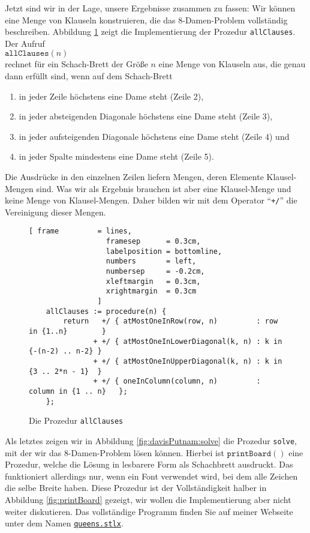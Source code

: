 Jetzt sind wir in der Lage, unsere Ergebnisse zusammen zu fassen:  Wir können eine
Menge von Klauseln konstruieren, die das 8-Damen-Problem vollständig beschreiben.
Abbildung \ref{fig:allClauses} zeigt die Implementierung der Prozedur \texttt{allClauses}.
Der Aufruf \\[0.2cm]
\hspace*{1.3cm} $\texttt{allClauses}(n)$ \\[0.2cm]
rechnet für ein Schach-Brett der Größe $n$ eine Menge von Klauseln aus, die
genau dann erfüllt sind, wenn auf dem Schach-Brett
\begin{enumerate}
\item in jeder Zeile höchstens eine Dame steht (Zeile 2),
\item in jeder absteigenden Diagonale höchstens eine Dame steht (Zeile 3),
\item in jeder aufsteigenden Diagonale höchstens eine Dame steht (Zeile 4) und
\item in jeder Spalte mindestens eine Dame steht (Zeile 5).
\end{enumerate}
Die Ausdrücke in den einzelnen Zeilen liefern Mengen, deren Elemente
Klausel-Mengen sind.  Was wir als Ergebnis brauchen ist aber eine Klausel-Menge
und keine Menge von Klausel-Mengen.  Daher bilden wir mit dem Operator ``\texttt{+/}''
die Vereinigung dieser Mengen.

\begin{figure}[!ht]
  \centering
\begin{Verbatim}[ frame         = lines, 
                  framesep      = 0.3cm, 
                  labelposition = bottomline,
                  numbers       = left,
                  numbersep     = -0.2cm,
                  xleftmargin   = 0.3cm,
                  xrightmargin  = 0.3cm
                ]
    allClauses := procedure(n) {
        return   +/ { atMostOneInRow(row, n)         : row in {1..n}        }
               + +/ { atMostOneInLowerDiagonal(k, n) : k in {-(n-2) .. n-2} }
               + +/ { atMostOneInUpperDiagonal(k, n) : k in {3 .. 2*n - 1}  }
               + +/ { oneInColumn(column, n)         : column in {1 .. n}   };
    };
\end{Verbatim}
\vspace*{-0.3cm}
  \caption{Die Prozedur \texttt{allClauses}}
  \label{fig:allClauses}
\end{figure}

Als letztes zeigen wir in Abbildung \ref{fig:davisPutnam:solve} die Prozedur
\texttt{solve}, mit der wir das 8-Damen-Problem lösen können.
Hierbei ist $\texttt{printBoard}()$ eine Prozedur, welche die Lösung in lesbarere Form als Schachbrett
ausdruckt.  Das funktioniert allerdings nur, wenn ein Font verwendet wird, bei dem alle Zeichen die
selbe Breite haben.  Diese Prozedur ist der Vollständigkeit halber in Abbildung \ref{fig:printBoard}
gezeigt, wir wollen die Implementierung aber nicht weiter diskutieren.
Das vollständige Programm finden Sie auf meiner Webseite unter dem Namen
\href{https://github.com/karlstroetmann/Logik/blob/master/SetlX/queens.stlx}{\texttt{queens.stlx}}.


